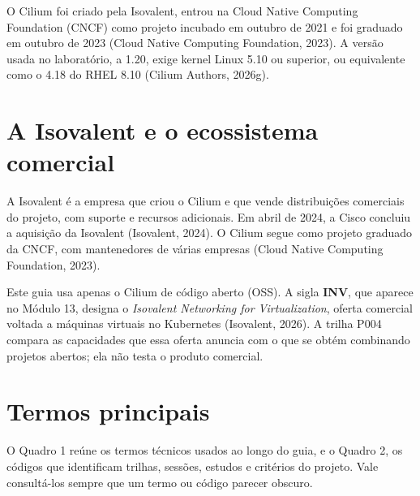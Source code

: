 \documentclass[12pt,openany,oneside,a4paper,chapter=TITLE,english,brazil]{abntex2}
\begin{document}
O Cilium foi criado pela Isovalent, entrou na Cloud Native Computing
Foundation (CNCF) como projeto incubado em outubro de 2021 e foi graduado em
outubro de 2023 (Cloud Native Computing Foundation, 2023). A versão usada no
laboratório, a 1.20, exige kernel Linux 5.10 ou superior, ou equivalente como o
4.18 do RHEL 8.10 (Cilium Authors, 2026g).

\section*{A Isovalent e o ecossistema comercial}\label{a-isovalent-e-o-ecossistema-comercial}

A Isovalent é a empresa que criou o Cilium e que vende distribuições
comerciais do projeto, com suporte e recursos adicionais. Em abril de 2024, a
Cisco concluiu a aquisição da Isovalent (Isovalent, 2024). O Cilium segue como
projeto graduado da CNCF, com mantenedores de várias empresas (Cloud Native
Computing Foundation, 2023).

Este guia usa apenas o Cilium de código aberto (OSS). A sigla \textbf{INV}, que
aparece no Módulo 13, designa o \emph{Isovalent Networking for Virtualization},
oferta comercial voltada a máquinas virtuais no Kubernetes (Isovalent, 2026).
A trilha P004 compara as capacidades que essa oferta anuncia com o que se
obtém combinando projetos abertos; ela não testa o produto comercial.

\section*{Termos principais}\label{termos-principais}

O Quadro 1 reúne os termos técnicos usados ao longo do guia, e o Quadro 2,
os códigos que identificam trilhas, sessões, estudos e critérios do projeto.
Vale consultá-los sempre que um termo ou código parecer obscuro.
\end{document}
